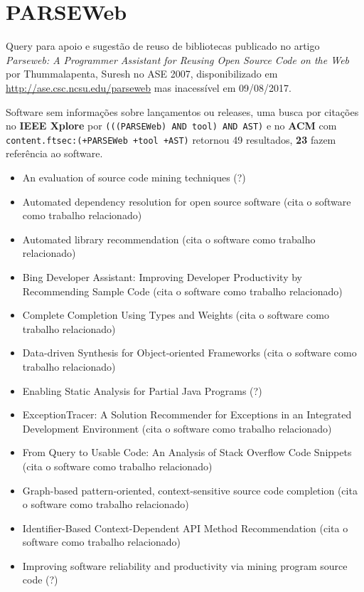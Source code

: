 \section{PARSEWeb}

Query para apoio e sugestão de reuso de bibliotecas
publicado no artigo {\it Parseweb: A Programmer Assistant for Reusing Open Source Code on the Web}
por Thummalapenta, Suresh
no ASE 2007,
disponibilizado em \url{http://ase.csc.ncsu.edu/parseweb}
mas inacessível em 09/08/2017.

Software sem informações sobre lançamentos ou releases,
uma busca por citações no {\bf IEEE Xplore} por
\texttt{(((PARSEWeb) AND tool) AND AST)}
e no {\bf ACM} com
\texttt{content.ftsec:(+PARSEWeb +tool +AST)}
retornou
49 resultados,
{\bf 23} fazem referência ao software.

\begin{itemize}
\item An evaluation of source code mining techniques (?)
\item Automated dependency resolution for open source software (cita o software como trabalho relacionado)
\item Automated library recommendation (cita o software como trabalho relacionado)
\item Bing Developer Assistant: Improving Developer Productivity by Recommending Sample Code (cita o software como trabalho relacionado)
\item Complete Completion Using Types and Weights (cita o software como trabalho relacionado)
\item Data-driven Synthesis for Object-oriented Frameworks (cita o software como trabalho relacionado)
\item Enabling Static Analysis for Partial Java Programs (?)
\item ExceptionTracer: A Solution Recommender for Exceptions in an Integrated Development Environment (cita o software como trabalho relacionado)
\item From Query to Usable Code: An Analysis of Stack Overflow Code Snippets (cita o software como trabalho relacionado)
\item Graph-based pattern-oriented, context-sensitive source code completion (cita o software como trabalho relacionado)
\item Identifier-Based Context-Dependent API Method Recommendation (cita o software como trabalho relacionado)
\item Improving software reliability and productivity via mining program source code (?)

\end{itemize}
